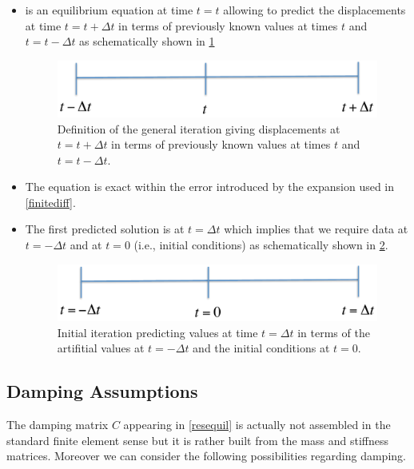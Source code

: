 \documentclass[12pt,letterpaper]{article}
\begin{document}
\begin{itemize}
\item {} is an equilibrium equation at time $t=t$ allowing to predict the displacements at time $t=t+\Delta t$ in terms of previously known values at times $t$ and $t=t-\Delta t$ as schematically shown in \cref{fig:time iteration}

\begin{figure}[h]
\centering
\includegraphics[width=12cm]{IMAGES/figure7_0.pdf}
\caption{Definition of the general iteration giving displacements at $t=t+\Delta t$ in terms of previously known values at times $t$ and $t=t-\Delta t$.}
\label{fig:time iteration}
\end{figure}

\item The equation is exact within the error introduced by the expansion used in \cref{finitediff}.



\item The first predicted solution is at $t=\Delta t$ which implies that we require data at $t=-\Delta t$ and at $t=0$ (i.e., initial conditions) as schematically shown in \cref{fig:initial time iteration}.

\begin{figure}[H]
\centering
\includegraphics[width=12cm]{IMAGES/figure7_1.pdf}
\caption{Initial iteration predicting values at time $t=\Delta t$ in terms of the artifitial values at $t=-\Delta t$ and the initial conditions at  $t=0$.}
\label{fig:initial time iteration}
\end{figure}

\end{itemize}

\subsection*{Damping Assumptions}
The damping matrix $C$ appearing in \cref{resequil} is actually not assembled in the standard finite element sense but it is rather built from the mass and stiffness matrices. Moreover we can consider the following possibilities regarding damping.
\end{document}
